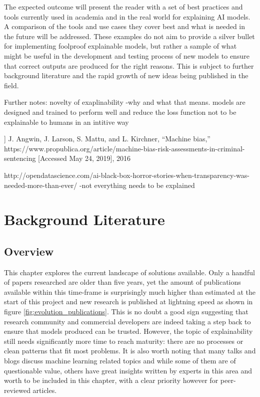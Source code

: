 \documentclass[proposal]{softeng}
\begin{document}
    The expected outcome will present the reader with a set of best practices and tools currently used in academia and in the real world for explaining AI models. A comparison of the tools and use cases they cover best and what is needed in the future will be addressed. These examples do not aim to provide a silver bullet for implementing foolproof explainable models, but rather a sample of what might be useful in the development and testing process of new models to ensure that correct outputs are produced for the right reasons. This is subject to further background literature and the rapid growth of new ideas being published in the field.

    Further notes:
    novelty of exaplinability -why and what that means. models are designed and trained to perform well and reduce the loss function not to be explainable to humans in an intitive way

] J. Angwin, J. Larson, S. Mattu, and L. Kirchner, “Machine bias,”
https://www.propublica.org/article/machine-bias-risk-assessments-in-criminal-sentencing
[Accessed May 24, 2019], 2016

http://opendatascience.com/ai-black-box-horror-stories-when-transparency-was-needed-more-than-ever/
-not everything needs to be explained

\newpage
\section{Background Literature}
\subsection{Overview}
This chapter explores the current landscape of solutions available. Only a handful of papers researched are older than five years, yet the amount of publications available within this time-frame is surprisingly much higher than estimated at the start of this project and new research is published at lightning speed as shown in figure \ref{fig:evolution_publications}. This is no doubt a good sign suggesting that research community and commercial developers are indeed taking a step back to ensure that models produced can be trusted. However, the topic of explainability still needs significantly more time to reach maturity: there are no processes or clean patterns that fit most problems. It is also worth noting that many talks and blogs discuss machine learning related topics and while some of them are of questionable value, others have great insights written by experts in this area and worth to be included in this chapter, with a clear priority however for peer-reviewed articles.
\end{document}
